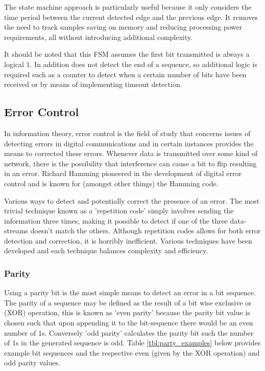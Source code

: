 The state machine approach is particularly useful because it only considers the time period between the current detected edge and the previous edge. It removes the need to track samples saving on memory and reducing processing power requirements, all without introducing additional complexity.

It should be noted that this FSM assumes the first bit transmitted is always a logical 1. In addition does not detect the end of a sequence, so additional logic is required such as a counter to detect when a certain number of bits have been received or by means of implementing timeout detection.


\subsection{Error Control}

In information theory, error control is the field of study that concerns issues of detecting errors in digital communications and in certain instances provides the means to corrected these errors. Whenever data is transmitted over some kind of network, there is the possibility that interference can cause a bit to flip resulting in an error. Richard Hamming pioneered in the development of digital error control and is known for (amongst other things) the Hamming code.

Various ways to detect and potentially correct the presence of an error. The most trivial technique known as a 'repetition code' simply involves sending the information three times, making it possible to detect if one of the three data-streams doesn't match the others. Although repetition codes allows for both error detection and correction, it is horribly inefficient. Various techniques have been developed and each technique balances complexity and efficiency.

\subsubsection{Parity}
Using a parity bit is the most simple means to detect an error in a bit sequence. The parity of a sequence may be defined as the result of a bit wise exclusive or (XOR) operation, this is known as 'even parity' because the parity bit value is chosen such that upon appending it to the bit-sequence there would be an even number of 1s. Conversely 'odd parity' calculates the parity bit such the number of 1s in the generated sequence is odd. Table \ref{tbl:party_examples} below provides example bit sequences and the respective even (given by the XOR operation) and odd parity values.

